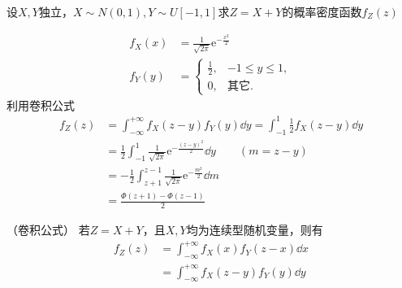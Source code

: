 \begin{example}
    设$X,Y$独立，$X\sim N(0,1),Y\sim U[-1,1]$求$Z=X+Y$的概率密度函数$f_Z(z)$
\end{example}
\begin{solution}
    \begin{align*}
        f_X(x) & = \frac{1}{\sqrt{2\pi}}\mathrm{e}^{-\frac{x^2}{2}} \\
        f_Y(y) & =
        \begin{cases}
            \frac{1}{2}, & -1\leq y\leq 1, \\
            0,           & \text{其它}.
        \end{cases}
    \end{align*}
    利用卷积公式
    \begin{align*}
        f_Z(z) & = \int_{-\infty}^{+\infty} f_X(z-y)f_Y(y)\dd{y} = \int_{-1}^1 \frac{1}{2}f_X(z-y)\dd{y}          \\
               & =\frac{1}{2}\int_{-1}^1 \frac{1}{\sqrt{2\pi}}\mathrm{e}^{-\frac{(z-y)^2}{2}}\dd{y} \qquad(m=z-y) \\
               & = -\frac{1}{2}\int_{z+1}^{z-1} \frac{1}{\sqrt{2\pi}} \mathrm{e}^{-\frac{m^2}{2}}\dd{m}           \\
               & = \frac{\Phi(z+1)-\Phi(z-1)}{2}
    \end{align*}
\end{solution}

\begin{theorem}
    （卷积公式）
    \label{eq:卷积公式}
    若$Z=X+Y$，且$X,Y$均为连续型随机变量，则有
    \begin{align*}
        f_Z(z) & = \int_{-\infty}^{+\infty} f_X(x)f_Y(z-x)\dd{x} \\
               & = \int_{-\infty}^{+\infty} f_X(z-y)f_Y(y)\dd{y}
    \end{align*}
\end{theorem}

